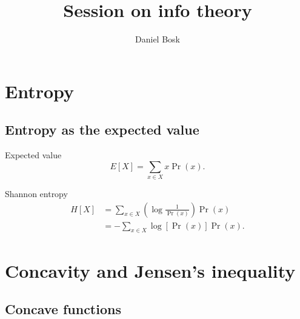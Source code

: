 \title{%
  Session on info theory
}
\author{Daniel Bosk}


\mode*

\begin{abstract}
  
\end{abstract}


\section{Entropy}

\subsection{Entropy as the expected value}

\begin{frame}
  \begin{block}{Expected value}
    \[
      E[X] = \sum_{x\in X} x \Pr(x).
    \]
  \end{block}

  \pause

  \begin{block}{Shannon entropy}
    \begin{align*}
      H[X]
            &= \sum_{x\in X} \left( \log\frac{1}{\Pr(x)} \right) \Pr(x) \\
            &= -\sum_{x\in X} \log[ \Pr(x) ] \Pr(x).
    \end{align*}
  \end{block}
\end{frame}


\section[Concavity and Jensen]{Concavity and Jensen's inequality}

\subsection{Concave functions}

